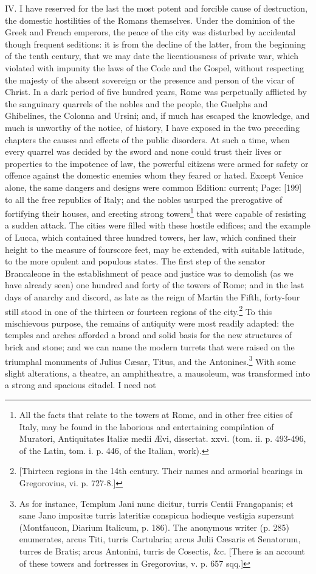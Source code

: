 IV. I have reserved for the last the most potent and forcible cause of destruction, the domestic hostilities of the Romans themselves. Under the dominion of the Greek and French emperors, the peace of the city was disturbed by accidental though frequent seditions: it is from the decline of the latter, from the beginning of the tenth century, that we may date the licentiousness of private war, which violated with impunity the laws of the Code and the Gospel, without respecting the majesty of the absent sovereign or the presence and person of the vicar of Christ. In a dark period of five hundred years, Rome was perpetually afflicted by the sanguinary quarrels of the nobles and the people, the Guelphs and Ghibelines, the Colonna and Ursini; and, if much has escaped the knowledge, and much is unworthy of the notice, of history, I have exposed in the two preceding chapters the causes and effects of the public disorders. At such a time, when every quarrel was decided by the sword and none could trust their lives or properties to the impotence of law, the powerful citizens were armed for safety or offence against the domestic enemies whom they feared or hated. Except Venice alone, the same dangers and designs were common Edition: current; Page: [199] to all the free republics of Italy; and the nobles usurped the prerogative of fortifying their houses, and erecting strong towers\footnote{All the facts that relate to the towers at Rome, and in other free cities of Italy, may be found in the laborious and entertaining compilation of Muratori, Antiquitates Italiæ medii Ævi, dissertat. xxvi. (tom. ii. p. 493-496, of the Latin, tom. i. p. 446, of the Italian, work).} that were capable of resisting a sudden attack. The cities were filled with these hostile edifices; and the example of Lucca, which contained three hundred towers, her law, which confined their height to the measure of fourscore feet, may be extended, with suitable latitude, to the more opulent and populous states. The first step of the senator Brancaleone in the establishment of peace and justice was to demolish (as we have already seen) one hundred and forty of the towers of Rome; and in the last days of anarchy and discord, as late as the reign of Martin the Fifth, forty-four still stood in one of the thirteen or fourteen regions of the city.\footnote{[Thirteen regions in the 14th century. Their names and armorial bearings in Gregorovius, vi. p. 727-8.]} To this mischievous purpose, the remains of antiquity were most readily adapted: the temples and arches afforded a broad and solid basis for the new structures of brick and stone; and we can name the modern turrets that were raised on the triumphal monuments of Julius Cæsar, Titus, and the Antonines.\footnote{As for instance, Templum Jani nunc dicitur, turris Centii Frangapanis; et sane Jano impositæ turris lateritiæ conspicua hodieque vestigia supersunt (Montfaucon, Diarium Italicum, p. 186). The anonymous writer (p. 285) enumerates, arcus Titi, turris Cartularia; arcus Julii Cæsaris et Senatorum, turres de Bratis; arcus Antonini, turris de Cosectis, \&c. [There is an account of these towers and fortresses in Gregorovius, v. p. 657 sqq.]} With some slight alterations, a theatre, an amphitheatre, a mausoleum, was transformed into a strong and spacious citadel. I need not 